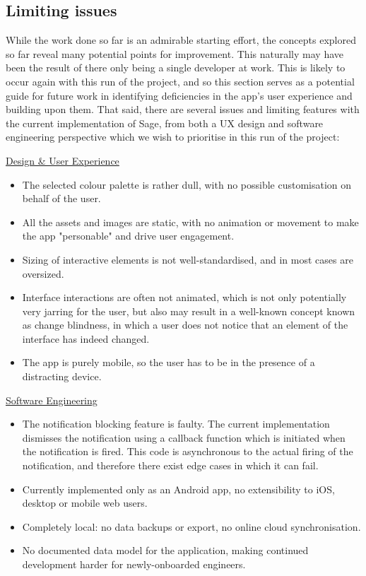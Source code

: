 \subsection{Limiting issues}
While the work done so far is an admirable starting effort, the concepts explored so far reveal many potential points for improvement. This naturally may have been the result of there only being a single developer at work. This is likely to occur again with this run of the project, and so this section serves as a potential guide for future work in identifying deficiencies in the app's user experience and building upon them. That said, there are several issues and limiting features with the current implementation of Sage, from both a UX design and software engineering perspective which we wish to prioritise in this run of the project:

\underline{Design \& User Experience}
\begin{itemize}
    \item The selected colour palette is rather dull, with no possible customisation on behalf of the user.
    \item All the assets and images are static, with no animation or movement to make the app "personable" and drive user engagement.
    \item Sizing of interactive elements is not well-standardised, and in most cases are oversized.
    \item Interface interactions are often not animated, which is not only potentially very jarring for the user, but also may result in a well-known concept known as change blindness, in which a user does not notice that an element of the interface has indeed changed.
    \item The app is purely mobile, so the user has to be in the presence of a distracting device.
\end{itemize}

\underline{Software Engineering}
\begin{itemize}
    \item The notification blocking feature is faulty. The current implementation dismisses the notification using a callback function which is initiated when the notification is fired. This code is asynchronous to the actual firing of the notification, and therefore there exist edge cases in which it can fail.
    \item Currently implemented only as an Android app, no extensibility to iOS, desktop or mobile web users.
    \item Completely local: no data backups or export, no online cloud synchronisation.
    \item No documented data model for the application, making continued development harder for newly-onboarded engineers.
\end{itemize}
